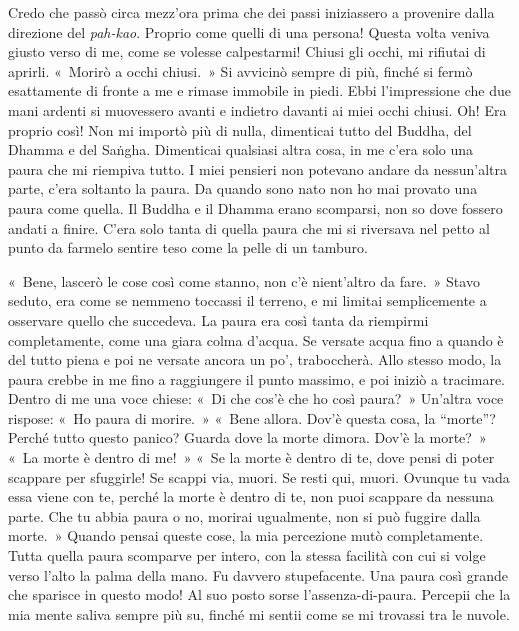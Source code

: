 Credo che passò circa mezz'ora prima che dei passi iniziassero a
provenire dalla direzione del \emph{pah-kao}. Proprio come quelli di una
persona! Questa volta veniva giusto verso di me, come se volesse
calpestarmi! Chiusi gli occhi, mi rifiutai di aprirli. «~Morirò a occhi
chiusi.~» Si avvicinò sempre di più, finché si fermò esattamente di
fronte a me e rimase immobile in piedi. Ebbi l'impressione che due mani
ardenti si muovessero avanti e indietro davanti ai miei occhi chiusi.
Oh! Era proprio così! Non mi importò più di nulla, dimenticai tutto del
Buddha, del Dhamma e del Saṅgha. Dimenticai qualsiasi altra cosa, in me
c'era solo una paura che mi riempiva tutto. I miei pensieri non potevano
andare da nessun'altra parte, c'era soltanto la paura. Da quando sono
nato non ho mai provato una paura come quella. Il Buddha e il Dhamma
erano scomparsi, non so dove fossero andati a finire. C'era solo tanta
di quella paura che mi si riversava nel petto al punto da farmelo
sentire teso come la pelle di un tamburo.

«~Bene, lascerò le cose così come stanno, non c'è nient'altro da fare.~»
Stavo seduto, era come se nemmeno toccassi il terreno, e mi limitai
semplicemente a osservare quello che succedeva. La paura era così tanta
da riempirmi completamente, come una giara colma d'acqua. Se versate
acqua fino a quando è del tutto piena e poi ne versate ancora un po',
traboccherà. Allo stesso modo, la paura crebbe in me fino a raggiungere
il punto massimo, e poi iniziò a tracimare. Dentro di me una voce
chiese: «~Di che cos'è che ho così paura?~» Un'altra voce rispose: «~Ho
paura di morire.~» «~Bene allora. Dov'è questa cosa, la ``morte''?
Perché tutto questo panico? Guarda dove la morte dimora. Dov'è la
morte?~» «~La morte è dentro di me!~» «~Se la morte è dentro di te, dove
pensi di poter scappare per sfuggirle! Se scappi via, muori. Se resti
qui, muori. Ovunque tu vada essa viene con te, perché la morte è dentro
di te, non puoi scappare da nessuna parte. Che tu abbia paura o no,
morirai ugualmente, non si può fuggire dalla morte.~» Quando pensai
queste cose, la mia percezione mutò completamente. Tutta quella paura
scomparve per intero, con la stessa facilità con cui si volge verso
l'alto la palma della mano. Fu davvero stupefacente. Una paura così
grande che sparisce in questo modo! Al suo posto sorse
l'assenza-di-paura. Percepii che la mia mente saliva sempre più su,
finché mi sentii come se mi trovassi tra le nuvole.

